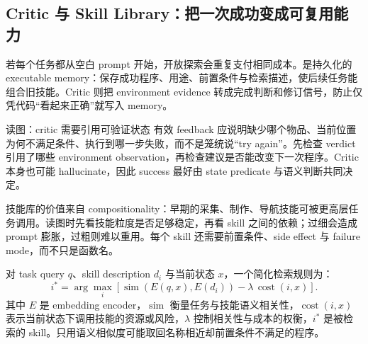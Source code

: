 
\subsection{Critic 与 Skill Library：把一次成功变成可复用能力}

若每个任务都从空白 prompt 开始，开放探索会重复支付相同成本。是持久化的 executable memory：保存成功程序、用途、前置条件与检索描述，使后续任务能组合旧技能。Critic 则把 environment evidence 转成完成判断和修订信号，防止仅凭代码“看起来正确”就写入 memory。


\begin{knowledgebox}{读图：critic 需要引用可验证状态}
有效 feedback 应说明缺少哪个物品、当前位置为何不满足条件、执行到哪一步失败，而不是笼统说“try again”。先检查 verdict 引用了哪些 environment observation，再检查建议是否能改变下一次程序。Critic 本身也可能 hallucinate，因此 success 最好由 state predicate 与语义判断共同决定。
\end{knowledgebox}


技能库的价值来自 compositionality：早期的采集、制作、导航技能可被更高层任务调用。读图时先看技能粒度是否足够稳定，再看 skill 之间的依赖；过细会造成 prompt 膨胀，过粗则难以重用。每个 skill 还需要前置条件、side effect 与 failure mode，而不只是函数名。

对 task query $q$、skill description $d_i$ 与当前状态 $x$，一个简化检索规则为：
\[
i^*=\arg\max_i\left[\operatorname{sim}(E(q,x),E(d_i))
-\lambda\,\operatorname{cost}(i,x)\right].
\]
其中 $E$ 是 embedding encoder，$\operatorname{sim}$ 衡量任务与技能语义相关性，$\operatorname{cost}(i,x)$ 表示当前状态下调用技能的资源或风险，$\lambda$ 控制相关性与成本的权衡，$i^*$ 是被检索的 skill。只用语义相似度可能取回名称相近却前置条件不满足的程序。


